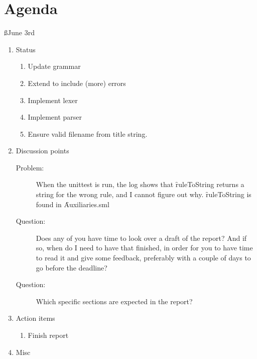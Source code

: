 \documentclass[a4paper]{article}
\begin{document}
\section{Agenda}


\ss{June 3rd}
\begin{enumerate}
  \item Status
    \begin{enumerate}[\HollowBox]
      \item[\Checkedbox] Update grammar
      \item[\Checkedbox] Extend to include (more) errors
      \item[\Checkedbox] Implement lexer
      \item[\Checkedbox] Implement parser
      \item[\Checkedbox] Ensure valid filename from title
      string.
    \end{enumerate}
  \item Discussion points
    \begin{description}
      \item[Problem:] When the unittest is run, the log shows that
      \f{ruleToString} returns a string for the wrong rule, and I cannot
      figure out why. \f{ruleToString} is found in \f{Auxiliaries.sml}
      \item[Question:] Does any of you have time to look over a draft of the
      report? And if so, when do I need to have that finished, in order for
      you to have time to read it and give some feedback, preferably with
      a couple of days to go before the deadline?
      \item[Question:] Which specific sections are expected in the report?
    \end{description}
  \item Action items
    \begin{enumerate}[\HollowBox]
      \item Finish report
    \end{enumerate}
  \item Misc
\end{enumerate}
\end{document}
